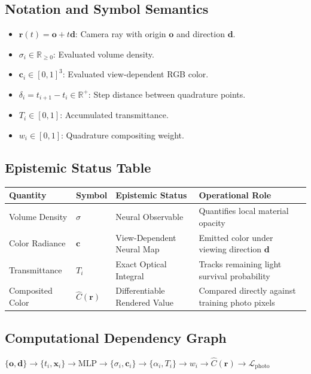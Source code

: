 \documentclass[11pt,a4paper]{article}
\theoremstyle{definition}
\begin{document}
\subsection{Notation and Symbol Semantics}
\begin{itemize}
    \item $\mathbf{r}(t) = \mathbf{o} + t \mathbf{d}$: Camera ray with origin $\mathbf{o}$ and direction $\mathbf{d}$.
    \item $\sigma_i \in \mathbb{R}_{\ge 0}$: Evaluated volume density.
    \item $\mathbf{c}_i \in [0, 1]^3$: Evaluated view-dependent RGB color.
    \item $\delta_i = t_{i+1} - t_i \in \mathbb{R}^+$: Step distance between quadrature points.
    \item $T_i \in [0, 1]$: Accumulated transmittance.
    \item $w_i \in [0, 1]$: Quadrature compositing weight.
\end{itemize}

\subsection{Epistemic Status Table}
\begin{table}[h]
\centering
\small
\begin{tabular}{@{}llll@{}}
\toprule
\textbf{Quantity} & \textbf{Symbol} & \textbf{Epistemic Status} & \textbf{Operational Role} \\
\midrule
Volume Density & $\sigma$ & Neural Observable & Quantifies local material opacity \\
Color Radiance & $\mathbf{c}$ & View-Dependent Neural Map & Emitted color under viewing direction $\mathbf{d}$ \\
Transmittance & $T_i$ & Exact Optical Integral & Tracks remaining light survival probability \\
Composited Color & $\hat{C}(\mathbf{r})$ & Differentiable Rendered Value & Compared directly against training photo pixels \\
\bottomrule
\end{tabular}
\end{table}

\subsection{Computational Dependency Graph}
{\centering
$\{\mathbf{o}, \mathbf{d}\} \longrightarrow \{t_i, \mathbf{x}_i\} \longrightarrow \text{MLP} \longrightarrow \{\sigma_i, \mathbf{c}_i\} \longrightarrow \{\alpha_i, T_i\} \longrightarrow w_i \longrightarrow \hat{C}(\mathbf{r}) \longrightarrow \mathcal{L}_{\text{photo}}$
\par}
\end{document}
